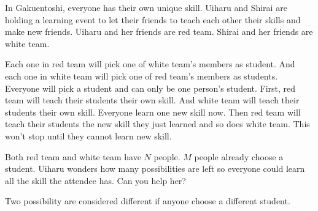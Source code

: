 In Gakuentoshi, everyone has their own unique skill. 
Uiharu and Shirai are holding a learning event to 
let their friends to teach each other their skills 
and make new friends. Uiharu and her friends are red team. 
Shirai and her friends are white team.

Each one in red team will pick one of white team's members as student. 
And each one in white team will pick one of red team's members as students. 
Everyone will pick a student and can only be one person's student. 
First, red team will teach their students their own skill. 
And white team will teach their students their own skill. 
Everyone learn one new skill now. 
Then red team will teach their students the new skill they just learned and 
so does white team. 
This won't stop until they cannot learn new skill.

Both red team and white team have $N$ people. 
$M$ people already choose a student.
Uiharu wonders how many possibilities are left so everyone could 
learn all the skill the attendee has. Can you help her?

Two possibility are considered different if anyone choose a different student.
